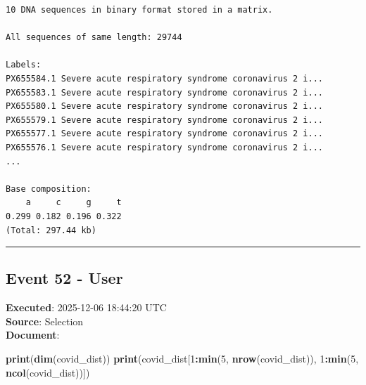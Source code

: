 \documentclass[
  11pt,
]{article}
\newenvironment{Shaded}{\begin{snugshade}}{\end{snugshade}}
\newcommand{\DecValTok}[1]{\textcolor[rgb]{0.00,0.00,0.81}{#1}}
\newcommand{\FunctionTok}[1]{\textcolor[rgb]{0.13,0.29,0.53}{\textbf{#1}}}
\newcommand{\NormalTok}[1]{#1}
\newcommand{\SpecialCharTok}[1]{\textcolor[rgb]{0.81,0.36,0.00}{\textbf{#1}}}
\newenvironment{rpoutput}{\vspace{0.5em}\begin{snugshade}}{\end{snugshade}}
\begin{document}
\begin{rpoutput}

\begin{verbatim}
10 DNA sequences in binary format stored in a matrix.

All sequences of same length: 29744 

Labels:
PX655584.1 Severe acute respiratory syndrome coronavirus 2 i...
PX655583.1 Severe acute respiratory syndrome coronavirus 2 i...
PX655580.1 Severe acute respiratory syndrome coronavirus 2 i...
PX655579.1 Severe acute respiratory syndrome coronavirus 2 i...
PX655577.1 Severe acute respiratory syndrome coronavirus 2 i...
PX655576.1 Severe acute respiratory syndrome coronavirus 2 i...
...

Base composition:
    a     c     g     t 
0.299 0.182 0.196 0.322 
(Total: 297.44 kb)
\end{verbatim}

\end{rpoutput}

\begin{center}\rule{0.5\linewidth}{0.5pt}\end{center}

\subsection{Event 52 - User}\label{event-52---user}

\textbf{Executed}: 2025-12-06 18:44:20 UTC\\
\textbf{Source}: Selection\\
\textbf{Document}:

\begin{Shaded}
\begin{Highlighting}[]
\FunctionTok{print}\NormalTok{(}\FunctionTok{dim}\NormalTok{(covid\_dist))}
\FunctionTok{print}\NormalTok{(covid\_dist[}\DecValTok{1}\SpecialCharTok{:}\FunctionTok{min}\NormalTok{(}\DecValTok{5}\NormalTok{, }\FunctionTok{nrow}\NormalTok{(covid\_dist)), }\DecValTok{1}\SpecialCharTok{:}\FunctionTok{min}\NormalTok{(}\DecValTok{5}\NormalTok{, }\FunctionTok{ncol}\NormalTok{(covid\_dist))])}
\end{Highlighting}
\end{Shaded}
\end{document}
